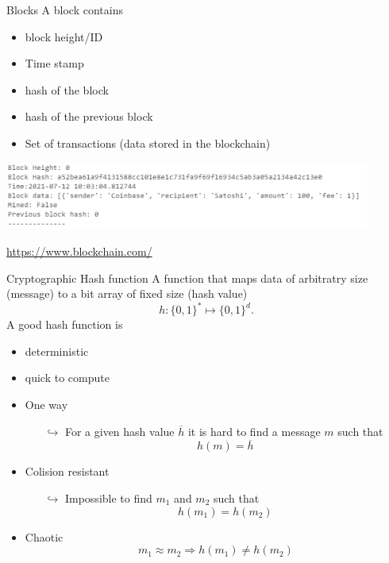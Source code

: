 \documentclass{beamer}
\begin{document}
\begin{frame}{Blocks}
A block contains
\begin{itemize}
  \item block height/ID
  \item Time stamp
  \item hash of the block
  \item hash of the previous block
  \item Set of transactions (data stored in the blockchain)
\end{itemize}
\begin{center}
\includegraphics[width=0.9\textwidth]{../../../Figures/genesis_block.png}
\end{center}
\url{https://www.blockchain.com/}
\end{frame}
\begin{frame}{Cryptographic Hash function}
\small
A function that maps data of arbitratry size (message) to a bit array of fixed size (hash value)
$$
h:\{0,1\}^\ast\mapsto \{0,1\}^d. 
$$
A good hash function is
\begin{itemize}
\item deterministic
\item quick to compute
\item One way
\begin{itemize}
  \scriptsize
\item[$\hookrightarrow$] For a given hash value $\overline{h}$ it is hard to find a message $m$ such that 
$$
h(m) = \overline{h}
$$
\end{itemize}
\item Colision resistant 
\begin{itemize}
\item[$\hookrightarrow$] Impossible to find $m_1$ and $m_2$ such that 
$$
h(m_1) = h(m_2)
$$
\end{itemize}
\item Chaotic
$$m_1\approx m_2\Rightarrow  h(m_1) \neq h(m_2)$$
\end{itemize}

\end{frame}
\end{document}
